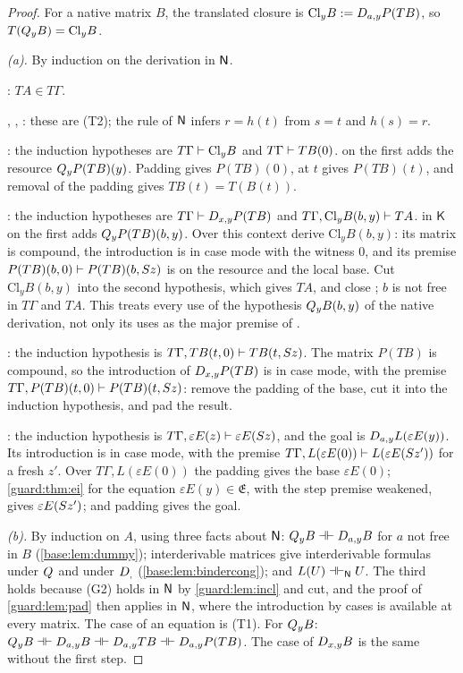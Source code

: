 \begin{proof}
For a native matrix $B$, the translated closure is
$\mathrm{Cl}_yB\mathrel{:=}D_{a,y}P(TB)$, so $T(Q_{y}B)=\mathrm{Cl}_yB$.

\emph{(a).}  By induction on the derivation in $\mathsf{N}$.

: $TA\in T\Gamma$.

, , : these are (T2); the rule
 of $\mathsf{N}$ infers $r=h(t)$ from $s=t$ and $h(s)=r$.

: the induction hypotheses are
$T\Gamma\vdash\mathrm{Cl}_yB$ and $T\Gamma\vdash TB(0)$.  
on the first adds the resource $Q_{y}P(TB)(y)$.  Padding gives $P(TB)(0)$,
 at $t$ gives $P(TB)(t)$, and removal of the padding gives
$TB(t)=T(B(t))$.

: the induction hypotheses are
$T\Gamma\vdash D_{x,y}P(TB)$ and
$T\Gamma,\mathrm{Cl}_yB(b,y)\vdash TA$.   in $\mathsf K$ on
the first adds $Q_{y}P(TB)(b,y)$.  Over this context derive
$\mathrm{Cl}_yB(b,y)$: its matrix is compound, the introduction is in case
mode with the witness $0$, and its premise
$P(TB)(b,0)\vdash P(TB)(b,S z)$ is  on the resource and
the local base.  Cut $\mathrm{Cl}_yB(b,y)$ into the second hypothesis, which
gives $TA$, and close ; $b$ is not free in $T\Gamma$ and $TA$.
This treats every use of the hypothesis $Q_{y}B(b,y)$ of the native
derivation, not only its uses as the major premise of .

: the induction hypothesis is
$T\Gamma,TB(t,0)\vdash TB(t,S z)$.  The matrix $P(TB)$ is compound, so
the introduction of $D_{x,y}P(TB)$ is in case mode, with the premise
$T\Gamma,P(TB)(t,0)\vdash P(TB)(t,S z)$: remove the padding of the
base, cut it into the induction hypothesis, and pad the result.

: the induction hypothesis is
$T\Gamma,\varepsilon E(z)\vdash\varepsilon E(S z)$, and the goal is
$D_{a,y}L(\varepsilon E(y))$.  Its introduction is in case mode, with the
premise $T\Gamma,L(\varepsilon E(0))\vdash L(\varepsilon E(S z'))$ for a
fresh $z'$.  Over $T\Gamma,L(\varepsilon E(0))$ the padding gives the base
$\varepsilon E(0)$; \cref{guard:thm:ei} for the equation
$\varepsilon E(y)\in\mathfrak E$, with the step premise weakened, gives
$\varepsilon E(S z')$; and padding gives the goal.

\emph{(b).}  By induction on $A$, using three facts about $\mathsf{N}$:
$Q_{y}B\dashv\vdash D_{a,y}B$ for $a$ not free in $B$
(\cref{base:lem:dummy}); interderivable matrices give interderivable
formulas under $Q_{}$ and under $D_{,}$ (\cref{base:lem:bindercong}); and
$L(U)\dashv\vdash_{\mathsf{N}}U$.  The third holds because
(G2) holds in $\mathsf{N}$ by \cref{guard:lem:incl} and cut, and the proof of
\cref{guard:lem:pad} then applies in $\mathsf{N}$, where the introduction by cases
is available at every matrix.  The case of an equation is (T1).  For
$Q_{y}B$: $Q_{y}B\dashv\vdash D_{a,y}B\dashv\vdash D_{a,y}TB\dashv\vdash
D_{a,y}P(TB)$.  The case of $D_{x,y}B$ is the same without the first
step.


\end{proof}
